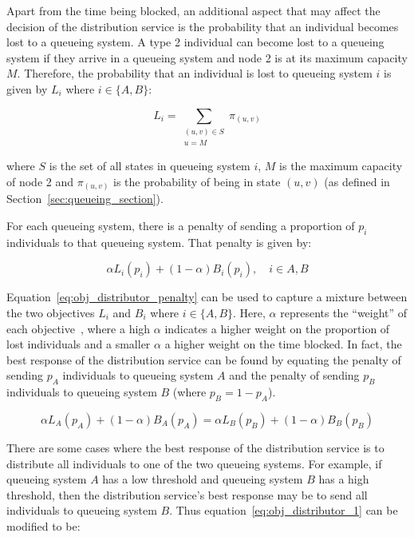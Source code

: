 Apart from the time being blocked, an additional aspect that may affect the
decision of the distribution service is the probability that an individual
becomes lost to a queueing system.
A type 2 individual can become lost to a queueing system if they arrive in a
queueing system and node 2 is at its maximum capacity \(M\).
Therefore, the probability that an individual is lost to queueing system \(i\)
is given by \(L_i\) where \(i \in \{A, B\}\):

\begin{equation}\label{eq:probability_lost}
    L_i = \sum_{\substack{(u, v) \in S \\ u = M}} \pi_{(u, v)}
\end{equation}

where \(S\) is the set of all states in queueing system \(i\), \(M\) is the
maximum capacity of node 2 and \(\pi_{(u, v)}\) is the probability of being in
state \((u, v)\) (as defined in Section~\ref{sec:queueing_section}).

For each queueing system, there is a penalty of sending a proportion of \(p_i\)
individuals to that queueing system.
That penalty is given by:

\begin{equation}\label{eq:obj_distributor_penalty}
    \alpha L_i(p_i) + (1 - \alpha) B_i(p_i), \quad i \in {A, B}
\end{equation}

Equation~\eqref{eq:obj_distributor_penalty} can be used to capture a mixture
between the two objectives \(L_i\) and \(B_i\) where \(i \in \{A, B\}\).
Here, \(\alpha\) represents the ``weight'' of each
objective~\cite{gunantara2018review},
where a high \(\alpha\) indicates a higher weight on the proportion of lost
individuals and a smaller \(\alpha\) a higher weight on the time blocked.
In fact, the best response of the distribution service can be found by equating
the penalty of sending \(p_A\) individuals to queueing system \(A\) and the
penalty
of sending \(p_B\) individuals to queueing system \(B\) (where \(p_B = 1-p_A\)).

\begin{equation}\label{eq:obj_distributor_1}
    \alpha L_A(p_A) + (1 - \alpha) B_A(p_A) =
    \alpha L_B(p_B) + (1 - \alpha) B_B(p_B)
\end{equation}

There are some cases where the best response of the distribution service is
to distribute all individuals to one of the two queueing systems.
For example, if queueing system \(A\) has a low threshold and queueing system
\(B\)
has a high threshold, then the distribution service's best response may be to
send all individuals to queueing system \(B\).
Thus equation~\eqref{eq:obj_distributor_1} can be modified to be:

